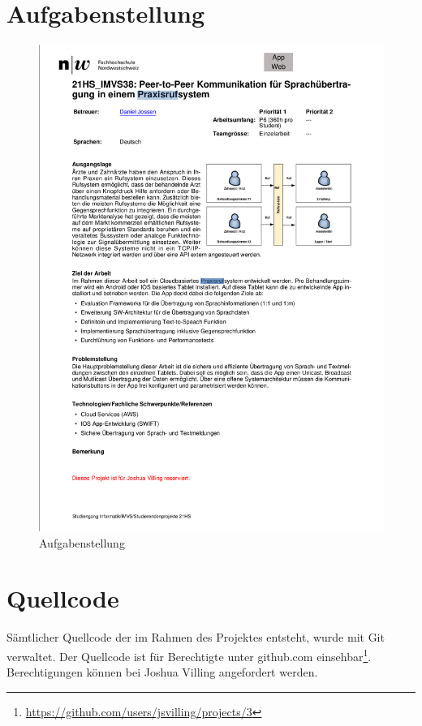 \renewcommand\refname{Literaturverzeichnis}
\printbibliography
\cleardoublepage
\listoffigures

\appendix
\clearpage
\section{Aufgabenstellung}\label{sec:aufgabenstellung}
\begin{figure}[h]
    \centering
    \begin{minipage}[b]{0.75\textwidth}
        \includegraphics[width=\textwidth]{graphics/aufgabenstellung}
        \caption{Aufgabenstellung}
    \end{minipage}\label{fig:aufgabenstellung}
\end{figure}

\clearpage

\section{Quellcode}\label{sec:quellcode}

Sämtlicher Quellcode der im Rahmen des Projektes entsteht, wurde mit Git verwaltet. Der Quellcode ist für Berechtigte unter github.com einsehbar\footnote{\url{https://github.com/users/jsvilling/projects/3}}.
Berechtigungen können bei Joshua Villing angefordert werden.

\clearpage



